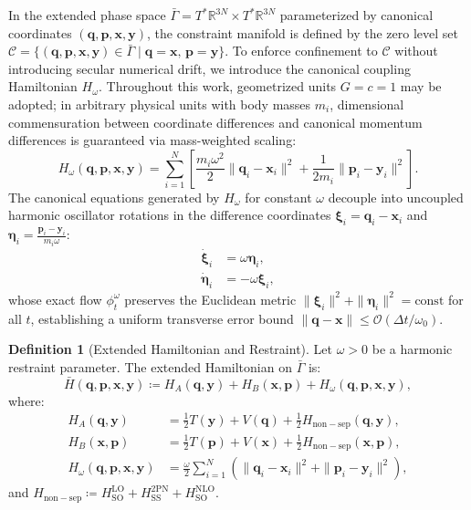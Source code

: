 \documentclass[11pt,a4paper,reqno]{article}
\theoremstyle{plain}
\theoremstyle{definition}
\newtheorem{definition}[theorem]{Definition}
\theoremstyle{remark}
\numberwithin{equation}{section}
\begin{document}
In the extended phase space $\bar{\Gamma} = T^*\mathbb{R}^{3N} \times T^*\mathbb{R}^{3N}$ parameterized by canonical coordinates $(\bm{q}, \bm{p}, \bm{x}, \bm{y})$, the constraint manifold is defined by the zero level set $\mathcal{C} = \{(\bm{q}, \bm{p}, \bm{x}, \bm{y}) \in \bar{\Gamma} \mid \bm{q} = \bm{x}, \, \bm{p} = \bm{y}\}$. To enforce confinement to $\mathcal{C}$ without introducing secular numerical drift, we introduce the canonical coupling Hamiltonian $H_\omega$. Throughout this work, geometrized units $G = c = 1$ may be adopted; in arbitrary physical units with body masses $m_i$, dimensional commensuration between coordinate differences and canonical momentum differences is guaranteed via mass-weighted scaling:
\begin{equation}
\label{eq:H_omega_exact}
H_\omega(\bm{q}, \bm{p}, \bm{x}, \bm{y}) = \sum_{i=1}^N \left[ \frac{m_i \omega^2}{2} \|\bm{q}_i - \bm{x}_i\|^2 + \frac{1}{2 m_i} \|\bm{p}_i - \bm{y}_i\|^2 \right].
\end{equation}
The canonical equations generated by $H_\omega$ for constant $\omega$ decouple into uncoupled harmonic oscillator rotations in the difference coordinates $\bm{\xi}_i = \bm{q}_i - \bm{x}_i$ and $\bm{\eta}_i = \frac{\bm{p}_i - \bm{y}_i}{m_i \omega}$:
\begin{align}
\dot{\bm{\xi}}_i &= \omega \bm{\eta}_i, \label{eq:xi_dot} \\
\dot{\bm{\eta}}_i &= -\omega \bm{\xi}_i, \label{eq:eta_dot}
\end{align}
whose exact flow $\phi^\omega_t$ preserves the Euclidean metric $\|\bm{\xi}_i\|^2 + \|\bm{\eta}_i\|^2 = \text{const}$ for all $t$, establishing a uniform transverse error bound $\|\bm{q} - \bm{x}\| \le \mathcal{O}(\Delta t / \omega_0)$.

\begin{definition}[Extended Hamiltonian and Restraint]
Let $\omega > 0$ be a harmonic restraint parameter. The extended Hamiltonian on $\bar{\Gamma}$ is:
\begin{equation}
\bar{H}(\bm{q}, \bm{p}, \bm{x}, \bm{y}) \coloneqq H_A(\bm{q}, \bm{y}) + H_B(\bm{x}, \bm{p}) + H_\omega(\bm{q}, \bm{p}, \bm{x}, \bm{y}),
\label{eq:extended_hamiltonian}
\end{equation}
where:
\begin{align}
H_A(\bm{q}, \bm{y}) &= \frac{1}{2} T(\bm{y}) + V(\bm{q}) + \frac{1}{2} H_{\mathrm{non-sep}}(\bm{q}, \bm{y}), \\
H_B(\bm{x}, \bm{p}) &= \frac{1}{2} T(\bm{p}) + V(\bm{x}) + \frac{1}{2} H_{\mathrm{non-sep}}(\bm{x}, \bm{p}), \\
H_\omega(\bm{q}, \bm{p}, \bm{x}, \bm{y}) &= \frac{\omega}{2} \sum_{i=1}^N \left( \|\bm{q}_i - \bm{x}_i\|^2 + \|\bm{p}_i - \bm{y}_i\|^2 \right),
\end{align}
and $H_{\mathrm{non-sep}} \coloneqq H_{\mathrm{SO}}^{\mathrm{LO}} + H_{\mathrm{SS}}^{\mathrm{2PN}} + H_{\mathrm{SO}}^{\mathrm{NLO}}$.
\end{definition}
\end{document}
